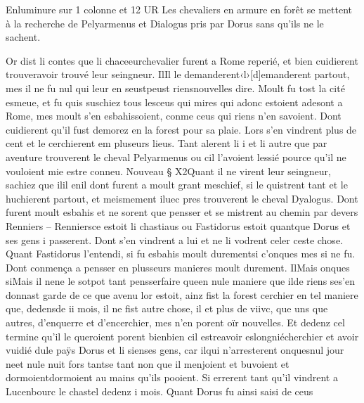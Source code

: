 \documentclass{article}
\begin{document}
\begin{pages}
               Enluminure sur 1 colonne et 12 UR
                  Les chevaliers en armure en forêt se mettent à la recherche de 
                  Pelyarmenus et 
                  Dialogus pris par Dorus 
                  sans qu’ils ne le sachent.
               
            
            \pstart Or dist li contes que li 
   chaceeurchevalier furent a 
   Rome reperié, et bien cuidierent 
               trouveravoir trouvé 
   leur seingneur. 
   IlIl le 
   demanderent‹l›[d]emanderent
   partout, 
   mes il ne fu nul qui leur en 
   seustpeust 
   riensnouvelles dire. 
   Moult fu tost la cité esmeue,
   et fu quis suschiez tous 
   lesceus qui mires 
   qui adonc estoient adesont a 
   Rome, mes moult s’en esbahissoient, conme ceus qui riens n’en savoient. 
   Dont cuidierent qu’il fust demorez en la forest pour sa plaie. 
   Lors s’en vindrent plus de cent et le cerchierent em pluseurs lieus. Tant alerent li i et li autre que par aventure 
   trouverent le cheval Pelyarmenus ou cil l’avoient lessié pource qu’il ne vouloient 
   mie estre conneu. 
   Nouveau § X2Quant il ne virent leur seingneur, sachiez que 
   ilil enil dont furent a moult grant meschief, 
   si le quistrent tant et 
   le huchierent partout, et 
   meismement iluec pres trouverent le 
   cheval Dyalogus. Dont furent moult esbahis et ne sorent que pensser et 
   se mistrent au chemin par devers Renniers – 
   Renniersce 
   estoit li chastiaus ou Fastidorus estoit 
   quantque Dorus et 
   ses gens i passerent. Dont s’en vindrent a lui et ne li vodrent celer ceste chose. 
   Quant Fastidorus l’entendi, si fu esbahis 
   moult durementsi c’onques mes si ne fu. 
   Dont conmença a pensser en plusseurs manieres moult durement. 
   IlMais onques siMais il
   nene le 
   sotpot 
   tant pensserfaire 
               queen nule maniere que
   ilde riens ses'en donnast garde 
   de ce que avenu lor estoit, ainz fist la forest cerchier en tel maniere que, 
   dedensde ii mois, 
   il ne fist autre chose, il et plus de 
   viivc, 
   que uns que autres, d’enquerre et d’encerchier, mes n’en porent oïr nouvelles. 
   Et dedenz cel termine qu’il le queroient porent 
   bienbien cil 
   estreavoir 
      eslongniécherchier et avoir vuidié 
   dule paÿs 
   Dorus et li sienses gens, 
   car ilqui n’arresterent 
   onquesnul jour 
   neet nule nuit 
   fors tantse tant non que
   il menjoient et buvoient et 
   dormoientdormoient au mains qu'ils pooient. 
   Si errerent tant qu'il
   vindrent a Lucenbourc le chastel dedenz i mois. \pend
\pstart Quant Dorus fu ainsi saisi de ceus 

\end{pages}
\end{document}
